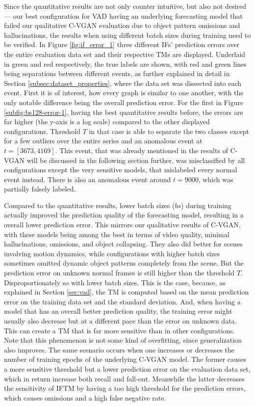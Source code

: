 Since the quantitative results are not only counter intuitive, but also not desired --- our best configuration for VAD having an underlying forecasting model that failed our qualitative C-VGAN evaluation due to object pattern omissions and hallucinations, the results when using different batch sizes during training need to be verified. In Figure \ref{fig:if_error_1} three different IFs' prediction errors over the entire evaluation data set and their respective TMs are displayed. Underlaid in green and red respectively, the true labels are shown, with red and green lines being separations between different events, as further explained in detail in Section \ref{subsec:dataset_properties}, where the data set was dissected into each event. First it is of interest, how every graph is similar to one another, with the only notable difference being the overall prediction error. For the first in Figure \ref{subfig:bs128-error-1}, having the best quantitative results before, the errors are far higher (the y-axis is a log scale) compared to the other displayed configurations. Threshold $T$ in that case is able to separate the two classes except for a few outliers over the entire series and an anomalous event at $t=[3673,4169]$. This event, that was already mentioned in the results of C-VGAN will be discussed in the following section further, was misclassified by all configurations except the very sensitive models, that mislabeled every normal event instead. There is also an anomalous event around $t=9000$, which was partially falsely labeled.

Compared to the quantitative results, lower batch sizes ($bs$) during training actually improved the prediction quality of the forecasting model, resulting in a overall lower prediction error. This mirrors our qualitative results of C-VGAN, with these models being among the best in terms of video quality, minimal hallucinations, omissions, and object collapsing. They also did better for scenes involving motion dynamics, while configurations with higher batch sizes sometimes omitted dynamic object patterns completely from the scene. But the prediction error on unknown normal frames is still higher than the threshold $T$. Disproportionately so with lower batch sizes. This is the case, because, as explained in Section \ref{sec:vad}, the TM is computed based on the mean prediction error on the training data set and the standard deviation. And, when having a model that has an overall better prediction quality, the training error might usually also decrease but at a different pace than the error on unknown data. This can create a TM that is far more sensitive than in other configurations. Note that this phenomenon is not some kind of overfitting, since generalization also improves. The same scenario occurs when one increases or decreases the number of training epochs of the underlying C-VGAN model. The former causes a more sensitive threshold but a lower prediction error on the evaluation data set, which in return increase both recall and fall-out. Meanwhile the latter decreases the sensitivity of IFTM by having a too high threshold for the prediction errors, which causes omissions and a high false negative rate.



